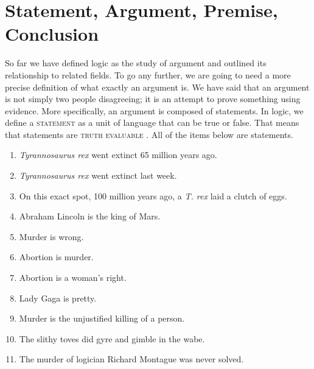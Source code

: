 
\section{Statement, Argument, Premise, Conclusion}\label{sec:partsofarguments}

So far we have defined logic as the study of argument and outlined its relationship to related fields. To go any further, we are going to need a more precise definition of what exactly an argument is. We have said that an argument is not simply two people disagreeing; it is an attempt to prove something using evidence. More specifically, an argument is composed of statements. In logic, we define a \textsc{\gls{statement}} \label{def:statement} as a unit of language that can be true or false. That means that statements are \textsc{\gls{truth evaluable}} \label{def:truth_evaluable}. All of the items below are statements.

\begin{enumerate}
	\item \label{itm:trex-true} \emph{Tyrannosaurus rex} went extinct 65 million years ago.
	\item \label{itm:trex-false} \emph{Tyrannosaurus rex} went extinct last week.
	\item \label{itm:trex-unknown} On this exact spot, 100  million years ago, a \emph{T. rex} laid a clutch of eggs.
	\item \label{itm:silly} Abraham Lincoln is the king of Mars.
	\item \label{itm:moral}Murder is wrong.
	\item \label{itm:opinion1}Abortion is murder.
	\item \label{itm:opinion2}Abortion is a woman's right.
	\item \label{itm:opinion3}Lady Gaga is pretty.
	\item \label{itm:definition}Murder is the unjustified killing of a person.
	\item \label{itm:nonsense}The slithy toves did gyre and gimble in the wabe.
	\item \label{itm:history}The murder of logician Richard Montague was never solved.
\end{enumerate}

